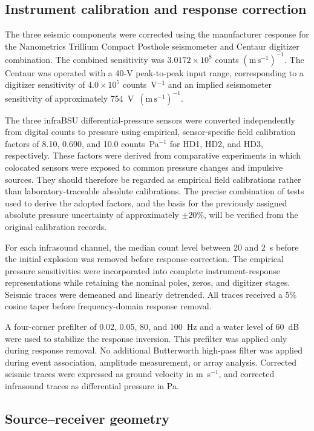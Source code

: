 \documentclass[]{seismica}
\begin{document}
\subsection{Instrument calibration and response correction}

The three seismic components were corrected using the manufacturer response
for the Nanometrics Trillium Compact Posthole seismometer and Centaur digitizer
combination. The combined sensitivity was
$3.0172\times10^8$ counts $(\mathrm{m\,s^{-1}})^{-1}$. The Centaur was
operated with a 40-V peak-to-peak input range, corresponding to a digitizer
sensitivity of $4.0\times10^5$ counts~V$^{-1}$ and an implied seismometer
sensitivity of approximately 754~V~$(\mathrm{m\,s^{-1}})^{-1}$.

The three infraBSU differential-pressure sensors were converted independently
from digital counts to pressure using empirical, sensor-specific field
calibration factors of 8.10, 0.690, and 10.0 counts~Pa$^{-1}$ for HD1, HD2,
and HD3, respectively. These factors were derived from comparative experiments
in which colocated sensors were exposed to common pressure changes and
impulsive sources. They should therefore be regarded as empirical field
calibrations rather than laboratory-traceable absolute calibrations. The
precise combination of tests used to derive the adopted factors, and the basis
for the previously assigned absolute pressure uncertainty of approximately
$\pm20\%$, will be verified from the original calibration records.

For each infrasound channel, the median count level between 20 and 2~s before
the initial explosion was removed before response correction. The empirical
pressure sensitivities were incorporated into complete instrument-response
representations while retaining the nominal poles, zeros, and digitizer
stages. Seismic traces were demeaned and linearly detrended. All traces received
a 5\% cosine taper before frequency-domain response removal.

A four-corner prefilter of 0.02, 0.05, 80, and 100~Hz and a water level of
60~dB were used to stabilize the response inversion. This prefilter was applied
only during response removal. No additional Butterworth high-pass filter was
applied during event association, amplitude measurement, or array analysis.
Corrected seismic traces were expressed as ground velocity in
m~s$^{-1}$, and corrected infrasound traces as differential pressure in Pa.


\subsection{Source--receiver geometry}
\end{document}
